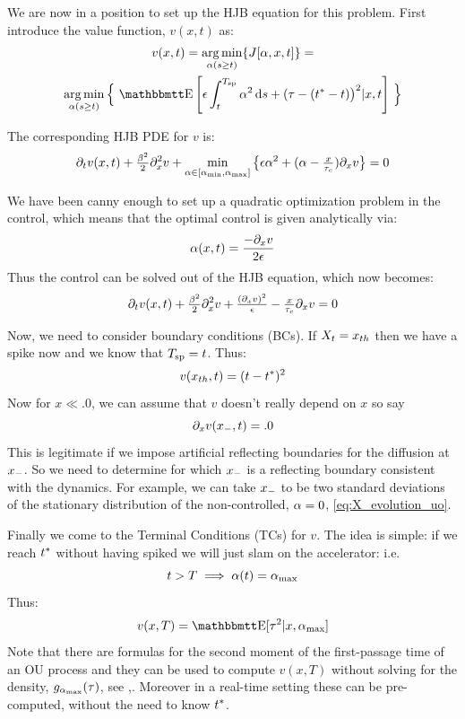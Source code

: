 \documentclass{article}
\begin{document}
We are now in a position to set up the HJB equation for this problem. First
introduce the value function, $v(x,t)$ as:
\begin{multline}
v(x,t) = \argmin_{\a(s \geq t)} \{J[\a, x,t] \} =
\\ 
\argmin_{\a(s \geq t)} 
\Big\{ \,
\Exp\left[
\e \int_t^\ts  \a^2 \intd{s}
+
(\t - (\T-t) \big)^2 |x,t
\right] \, \Big\}
\label{eq:OC_LS_mean_value}   
\end{multline}

The corresponding HJB PDE for $v$ is:
\begin{equation}
{\partial}_t v(x,t) + \tfrac{{\beta}^2}{2} {\partial}_x^2 v + \min_{{\alpha} \in [{ {\alpha}_{\textrm{min}} }, { {\alpha}_{\textrm{max}} }]}\big\{
{\epsilon} {\alpha}^2 + ({\alpha}-\tfrac{x}{{ \tau_{c} }}) {\partial}_x v \big\} = 0
\label{eq:OC_LS_mean_HJB}
\end{equation}

We have been canny enough to set up a quadratic optimization problem in the
control, which means that the optimal control is given analytically via:
\begin{equation}
{\alpha}(x,t) = \frac{-{\partial}_x v}{2{\epsilon}} 
\label{eq:OC_LS_variance_energy_quadratic_control}
\end{equation}
Thus the control can be solved out of the HJB equation, which now becomes:
\begin{equation}
{\partial}_t v(x,t) + \tfrac{{\beta}^2}{2} {\partial}_x^2 v + \tfrac{({\partial}_x v)^2}{{\epsilon}}
-\tfrac{x}{{ \tau_{c} }}{\partial}_x v= 0
\label{eq:OC_LS_mean_HJB}
\end{equation}

Now, we need to consider boundary conditions (BCs). If $X_t =
{ x_{th} }$ then we have a spike now and we know that ${ T_{\textrm{sp} } } = t$. Thus:
$$
v({ x_{th} },t) = (t-{ t^* })^2
$$
Now for $x \ll .0$, we can assume that $v$ doesn't really depend on $x$ so say 
$$
{\partial}_x v({ x_{-} }, t) = .0
$$
This is legitimate if we impose artificial reflecting boundaries for the
diffusion at ${ x_{-} }$. So we need to determine for which ${ x_{-} }$ is a reflecting
boundary consistent with the dynamics. For example, we can take ${ x_{-} }$ to be
two standard deviations of the stationary distribution of the non-controlled, ${\alpha}=0$, \cref{eq:X_evolution_uo}.

Finally we come to the Terminal Conditions (TCs) for $v$. The idea is simple: if
we reach ${ t^* }$ without having spiked we will just slam on the accelerator: i.e.
$$t>T \implies {\alpha}(t) = { {\alpha}_{\textrm{max}} }$$ Thus: $$ v(x,T) = \Exp[\t^2|x, \amax] $$ Note
that there are formulas for the second moment of the first-passage time of an OU
process and they can be used to compute $v(x,T)$ without solving for the
density, $g_{{ {\alpha}_{\textrm{max}} }}({\tau})$, see \cite{Ditlevsen2008a},\cite{Ricciardi1988}.
Moreover in a real-time setting these can be pre-computed, without the need to
know ${ t^* }$.
\end{document}
